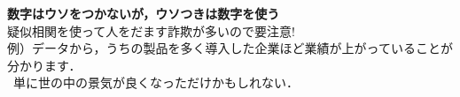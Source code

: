 {
  \centering
  \textbf{数字はウソをつかないが，ウソつきは数字を使う}\\[5mm]
  \pause
  \alert{疑似相関を使って人をだます詐欺が多いので要注意!}\\
  例）データから，うちの製品を多く導入した企業ほど業績が上がっていることが分かります．\\
  \ra~単に世の中の景気が良くなっただけかもしれない．
}


